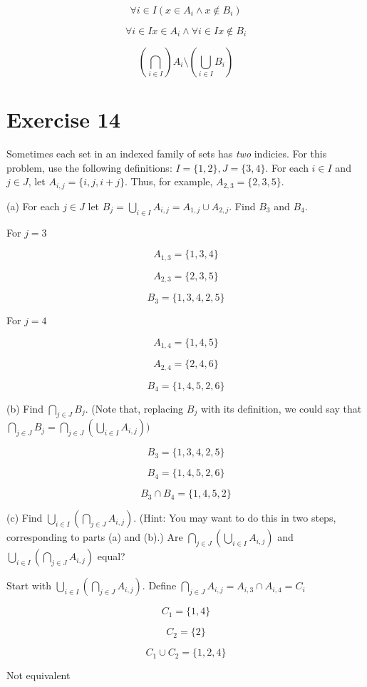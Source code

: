 \documentclass[11pt]{article}
\begin{document}
$$\forall i \in I (x \in A_i \wedge x \notin B_i)$$

$$\forall i \in I x \in A_i \wedge \forall i \in I x \notin B_i$$

$$(\bigcap_{i \in I}) A_i \setminus (\bigcup_{i \in I} B_i)$$

\section*{Exercise 14}

Sometimes  each set in an indexed family of sets has \textit{two} indicies.
For this problem, use the following definitions:
$I = \{1,2\}, J = \{3,4\}$. For each $i \in I$ and $j \in J$, let 
$A_{i, j} = \{i, j, i+j\}$. Thus, for example, $A_{2, 3} = \{2,3,5\}$.

\noindent (a) For each $j \in J$ let 
$B_j = \bigcup_{i \in I} A_{i,j} = A_{1,j} \cup A_{2,j}$. Find $B_3$ and $B_4$.

For $j = 3$

$$A_{1,3} = \{1,3,4\}$$

$$A_{2,3} = \{2,3,5\}$$

$$B_3 = \{1,3,4,2,5\}$$

For $j = 4$

$$A_{1,4} = \{1,4,5\}$$

$$A_{2,4} = \{2,4,6\}$$

$$B_4 = \{1,4,5,2,6\}$$

\noindent (b) Find $\bigcap_{j \in J} B_j$. (Note that, replacing $B_j$ with its
definition, we could say that $\bigcap_{j \in J} B_j = 
\bigcap_{j \in J} (\bigcup_{i \in I} A_{i, j}))$

$$B_3 = \{1,3,4,2,5\}$$

$$B_4 = \{1,4,5,2,6\}$$

$$B_3 \cap B_4 = \{1,4,5,2\}$$

\noindent (c) Find $\bigcup_{i \in I} (\bigcap_{j \in J} A_{i, j})$. (Hint: You 
may want to do this in two steps, corresponding to parts (a) and (b).) Are 
$\bigcap_{j \in J} (\bigcup_{i \in I} A_{i, j})$ and 
$\bigcup_{i \in I} (\bigcap_{j \in J} A_{i, j})$ equal?

Start with $\bigcup_{i \in I} (\bigcap_{j \in J} A_{i, j})$. Define 
$\bigcap_{j \in J} A_{i, j} = A_{i, 3} \cap A_{i, 4} = C_i$

$$C_1 = \{1, 4\}$$

$$C_2 = \{2\}$$

$$C_1 \cup C_2 = \{1,2,4\}$$

Not equivalent
\end{document}

